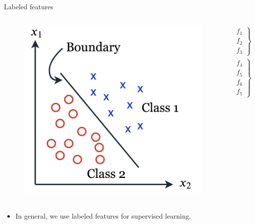 \begin{frame}{Labeled features}
\begin{columns}
\begin{column}{5cm}
\begin{figure}
\includegraphics[scale=0.65]{Figures/label.png}
\end{figure}
\end{column}
\begin{column}{5cm}
\[\begin{array}{*{20}{c}}
{\left. {\begin{array}{*{20}{c}}
{{f_1}}\\
{{f_2}}\\
{{f_3}}
\end{array}} \right\} \in {C_1}}\\
{\left. {\begin{array}{*{20}{c}}
{{f_4}}\\
{{f_5}}\\
{{f_6}}\\
{{f_7}}
\end{array}} \right\} \in {C_2}}
\end{array}\]
\end{column}
\end{columns}
\begin{itemize}
\item In general, we use labeled features for supervised learning.
\end{itemize}
\end{frame}

